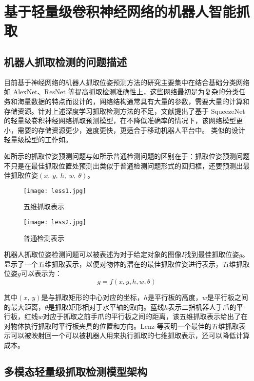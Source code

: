 \section{基于轻量级卷积神经网络的机器人智能抓取}

\subsection{机器人抓取检测的问题描述}

目前基于神经网络的机器人抓取位姿预测方法的研究主要集中在结合基础分类网络如 AlexNet、ResNet 等提高抓取检测准确性上，这些网络最初是为复杂的分类任务和海量数据的特点而设计的，网络结构通常具有大量的参数，需要大量的计算和存储资源。针对上述深度学习抓取检测方法的不足，文献\cite{bib:one}提出了基于 SqueezeNet 的轻量级卷积神经网络抓取预测模型，在不降低准确率的情况下，该网络模型更小，需要的存储资源更少，速度更快，更适合于移动机器人平台中。 类似的设计轻量级模型的工作如\cite{bib11}。

如所示的抓取位姿预测问题与如所示普通检测问题的区别在于：抓取位姿预测问题不只是在最佳抓取位置处预测出类似于普通检测问题形式的回归框，还要预测出最佳抓取位姿$(x,\ y,\ h,\ w,\ \theta)$。

\begin{figure}[!htbp]
	\centering
	\texttt{[image: less1.jpg]}
	\caption{五维抓取表示}
     \label{figless1}
\end{figure}
\begin{figure}[!htbp]
	\centering
	\texttt{[image: less2.jpg]}
	\caption{普通检测表示}
     \label{figless2}
\end{figure}

机器人抓取位姿检测问题可以被表述为对于给定对象的图像$I$找到最佳抓取位姿$g$。显示了一个五维抓取表示，以便对物体的潜在的最佳抓取位姿进行表示，五维抓取位姿$g$可以表示为：
\begin{equation}
g=f(x,y,h,w,\theta)
\label{eqgrasp}
\end{equation}

其中$(x,\ y)$是与抓取矩形的中心对应的坐标，$h$是平行板的高度，$w$是平行板之间的最大距离，$\theta$是抓取矩形相对于水平轴的取向。蓝线$h$表示二指机器人手爪的平行板，红线$w$对应于抓取之前手爪的平行板之间的距离，该五维抓取表示给出了在对物体执行抓取时平行板夹具的位置和方向。Lenz 等表明一个最佳的五维抓取表示可以被映射回一个可以被机器人用来执行抓取的七维抓取表示，还可以降低计算成本。

\subsection{多模态轻量级抓取检测模型架构}


